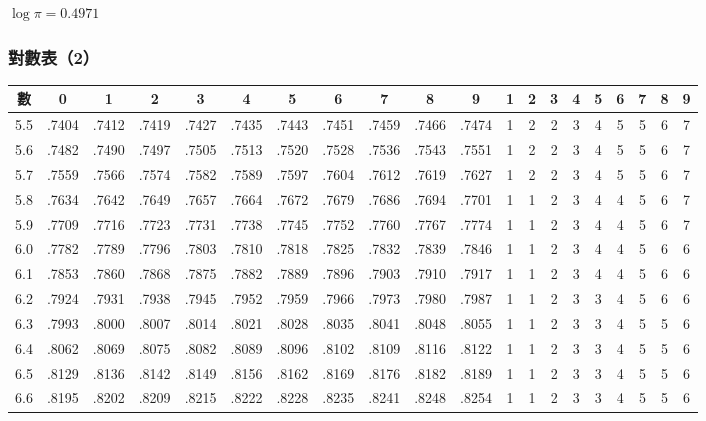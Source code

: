 \vspace{0.5em}
\noindent $\log \pi = 0.4971$

\clearpage
\subsubsection*{對數表（2）}
{\centering\fontsize{7.5pt}{8.8pt}\selectfont\setlength{\tabcolsep}{1.5pt}\renewcommand{\arraystretch}{0.96}
\begin{tabular}{|c|cccccccccc|ccccccccc|}
\hline
數 & 0 & 1 & 2 & 3 & 4 & 5 & 6 & 7 & 8 & 9 & 1 & 2 & 3 & 4 & 5 & 6 & 7 & 8 & 9 \\ \hline
5.5 & .7404 & .7412 & .7419 & .7427 & .7435 & .7443 & .7451 & .7459 & .7466 & .7474 & 1 & 2 & 2 & 3 & 4 & 5 & 5 & 6 & 7 \\
5.6 & .7482 & .7490 & .7497 & .7505 & .7513 & .7520 & .7528 & .7536 & .7543 & .7551 & 1 & 2 & 2 & 3 & 4 & 5 & 5 & 6 & 7 \\
5.7 & .7559 & .7566 & .7574 & .7582 & .7589 & .7597 & .7604 & .7612 & .7619 & .7627 & 1 & 2 & 2 & 3 & 4 & 5 & 5 & 6 & 7 \\
5.8 & .7634 & .7642 & .7649 & .7657 & .7664 & .7672 & .7679 & .7686 & .7694 & .7701 & 1 & 1 & 2 & 3 & 4 & 4 & 5 & 6 & 7 \\
5.9 & .7709 & .7716 & .7723 & .7731 & .7738 & .7745 & .7752 & .7760 & .7767 & .7774 & 1 & 1 & 2 & 3 & 4 & 4 & 5 & 6 & 7 \\
6.0 & .7782 & .7789 & .7796 & .7803 & .7810 & .7818 & .7825 & .7832 & .7839 & .7846 & 1 & 1 & 2 & 3 & 4 & 4 & 5 & 6 & 6 \\
6.1 & .7853 & .7860 & .7868 & .7875 & .7882 & .7889 & .7896 & .7903 & .7910 & .7917 & 1 & 1 & 2 & 3 & 4 & 4 & 5 & 6 & 6 \\
6.2 & .7924 & .7931 & .7938 & .7945 & .7952 & .7959 & .7966 & .7973 & .7980 & .7987 & 1 & 1 & 2 & 3 & 3 & 4 & 5 & 6 & 6 \\
6.3 & .7993 & .8000 & .8007 & .8014 & .8021 & .8028 & .8035 & .8041 & .8048 & .8055 & 1 & 1 & 2 & 3 & 3 & 4 & 5 & 5 & 6 \\
6.4 & .8062 & .8069 & .8075 & .8082 & .8089 & .8096 & .8102 & .8109 & .8116 & .8122 & 1 & 1 & 2 & 3 & 3 & 4 & 5 & 5 & 6 \\
6.5 & .8129 & .8136 & .8142 & .8149 & .8156 & .8162 & .8169 & .8176 & .8182 & .8189 & 1 & 1 & 2 & 3 & 3 & 4 & 5 & 5 & 6 \\
6.6 & .8195 & .8202 & .8209 & .8215 & .8222 & .8228 & .8235 & .8241 & .8248 & .8254 & 1 & 1 & 2 & 3 & 3 & 4 & 5 & 5 & 6 \\

\end{tabular}}
